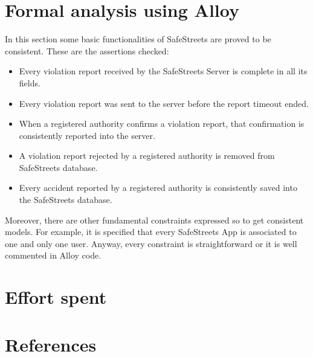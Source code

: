 \documentclass{article}
\begin{document}
	\section{Formal analysis using Alloy}
		In this section some basic functionalities of SafeStreets are proved to be consistent. These are the assertions checked:
		\begin{itemize}
			\item Every violation report received by the SafeStreets Server is complete in all its fields.
			\item Every violation report was sent to the server before the report timeout ended.
			\item When a registered authority confirms a violation report, that confirmation is consistently reported into the server.
			\item A violation report rejected by a registered authority is removed from SafeStreets database.
			\item Every accident reported by a registered authority is consistently saved into the SafeStreets database.
		\end{itemize}
		Moreover, there are other fundamental constraints expressed so to get consistent models. For example, it is specified that every SafeStreets App is associated to one and only one user. Anyway, every constraint is straightforward or it is well commented in Alloy code.
	\section{Effort spent}
	
	\section{References}
	
\end{document}
